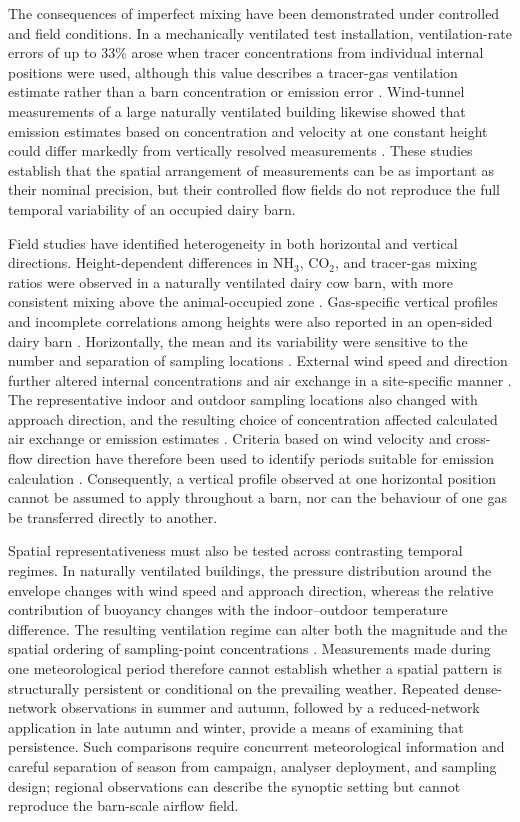 \documentclass[12pt,a4paper]{article}
\begin{document}
The consequences of imperfect mixing have been demonstrated under controlled
and field conditions. In a mechanically ventilated test installation,
ventilation-rate errors of up to 33\% arose when tracer concentrations from
individual internal positions were used, although this value describes a
tracer-gas ventilation estimate rather than a barn concentration or emission
error \citep{VanBuggenhout2009}. Wind-tunnel measurements of a large naturally
ventilated building likewise showed that emission estimates based on
concentration and velocity at one constant height could differ markedly from
vertically resolved measurements \citep{Janke2020}. These studies establish
that the spatial arrangement of measurements can be as important as their
nominal precision, but their controlled flow fields do not reproduce the full
temporal variability of an occupied dairy barn.

Field studies have identified heterogeneity in both horizontal and vertical
directions. Height-dependent differences in \(\mathrm{NH_3}\),
\(\mathrm{CO_2}\), and tracer-gas mixing ratios were observed in a naturally
ventilated dairy cow barn, with more consistent mixing above the
animal-occupied zone \citep{Mendes2015}. Gas-specific vertical profiles and
incomplete correlations among heights were also reported in an open-sided
dairy barn \citep{Durso2024}. Horizontally, the mean and its variability were
sensitive to the number and separation of sampling locations
\citep{Durso2022}. External wind speed and direction further altered internal
concentrations and air exchange in a site-specific manner
\citep{Saha2013}. The representative indoor and outdoor sampling locations
also changed with approach direction, and the resulting choice of
concentration affected calculated air exchange or emission estimates
\citep{Koenig2018,JankeSampling2020}. Criteria based on wind velocity and
cross-flow direction have therefore been used to identify periods suitable
for emission calculation \citep{Schmithausen2018}. Consequently, a vertical
profile observed at one horizontal
position cannot be assumed to apply throughout a barn, nor can the behaviour
of one gas be transferred directly to another.

Spatial representativeness must also be tested across contrasting temporal
regimes. In naturally ventilated buildings, the pressure distribution around
the envelope changes with wind speed and approach direction, whereas the
relative contribution of buoyancy changes with the indoor--outdoor temperature
difference. The resulting ventilation regime can alter both the magnitude and
the spatial ordering of sampling-point concentrations \citep{Saha2013}.
Measurements made during one meteorological period therefore cannot establish
whether a spatial pattern is structurally persistent or conditional on the
prevailing weather. Repeated dense-network observations in summer and autumn,
followed by a reduced-network application in late autumn and winter, provide a
means of examining that persistence. Such comparisons require concurrent
meteorological information and careful separation of season from campaign,
analyser deployment, and sampling design; regional observations can describe
the synoptic setting but cannot reproduce the barn-scale airflow field.
\end{document}
